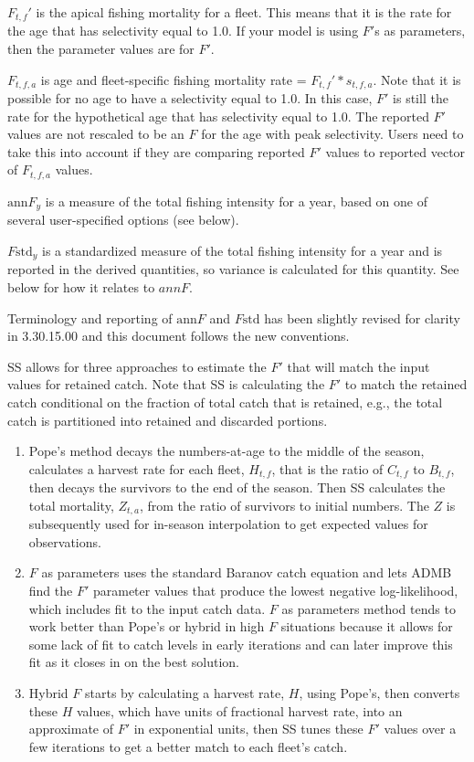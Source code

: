 $F_{t,f}'$ is the apical fishing mortality for a fleet.  This means that it is the rate for the age that has selectivity equal to 1.0.  If your model is using $F'$s as parameters, then the parameter values are for $F'$.

$F_{t,f,a}$  is age and fleet-specific fishing mortality rate = $F_{t,f}' * s_{t,f,a}$. Note that it is possible for no age to have a selectivity equal to 1.0.  In this case, $F'$ is still the rate for the hypothetical age that has selectivity equal to 1.0.  The reported $F'$ values are not rescaled to be an $F$ for the age with peak selectivity.  Users need to take this into account if they are comparing reported $F'$ values to reported vector of $F_{t,f,a}$ values.

$\text{ann}F_y$ is a measure of the total fishing intensity for a year, based on one of several user-specified options (see below).

$F\text{std}_y$ is a standardized measure of the total fishing intensity for a year and is reported in the derived quantities, so variance is calculated for this quantity. See below for how it relates to $annF$.

Terminology and reporting of $\text{ann}F$ and $F\text{std}$ has been slightly revised for clarity in 3.30.15.00 and this document follows the new conventions.

SS allows for three approaches to estimate the $F'$ that will match the input values for retained catch.  Note that SS is calculating the $F'$ to match the retained catch conditional on the fraction of total catch that is retained, e.g., the total catch is partitioned into retained and discarded portions.

\begin{enumerate}
	\item Pope’s method decays the numbers-at-age to the middle of the season, calculates a harvest rate for each fleet, $H_{t,f}$, that is the ratio of $C_{t,f}$ to $B_{t,f}$, then decays the survivors to the end of the season. Then SS calculates the total mortality, $Z_{t,a}$, from the ratio of survivors to initial numbers. The $Z$ is subsequently used for in-season interpolation to get expected values for observations.
	
	\item $F$ as parameters uses the standard Baranov catch equation and lets ADMB find the $F'$ parameter values that produce the lowest negative log-likelihood, which includes fit to the input catch data. $F$ as parameters method tends to work better than Pope’s or hybrid in high $F$ situations because it allows for some lack of fit to catch levels in early iterations and can later improve this fit as it closes in on the best solution.
	
	\item Hybrid $F$ starts by calculating a harvest rate, $H$, using Pope’s, then converts these $H$ values, which have units of fractional harvest rate, into an approximate of $F'$ in exponential units, then SS tunes these $F'$ values over a few iterations to get a better match to each fleet’s catch.
\end{enumerate}

